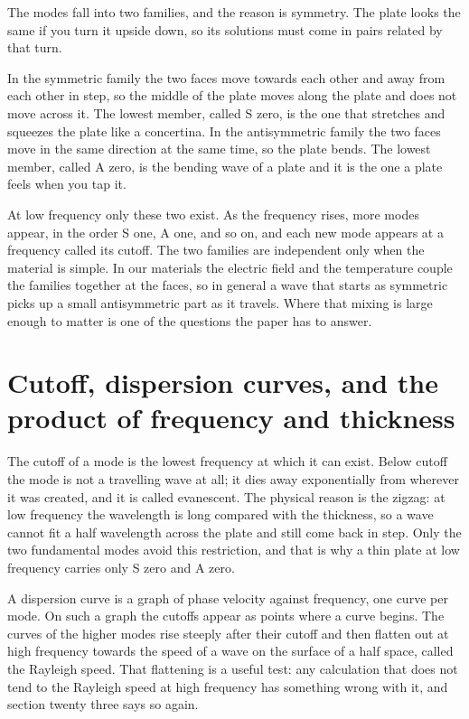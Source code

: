 \documentclass[11pt]{article}
\begin{document}
The modes fall into two families, and the reason is symmetry. The plate looks the same if you turn it upside
down, so its solutions must come in pairs related by that turn.

In the symmetric family the two faces move towards each other and away from each other in step, so the middle
of the plate moves along the plate and does not move across it. The lowest member, called S zero, is the one
that stretches and squeezes the plate like a concertina. In the antisymmetric family the two faces move in
the same direction at the same time, so the plate bends. The lowest member, called A zero, is the bending
wave of a plate and it is the one a plate feels when you tap it.

At low frequency only these two exist. As the frequency rises, more modes appear, in the order S one, A one,
and so on, and each new mode appears at a frequency called its cutoff. The two families are independent only
when the material is simple. In our materials the electric field and the temperature couple the families
together at the faces, so in general a wave that starts as symmetric picks up a small antisymmetric part as
it travels. Where that mixing is large enough to matter is one of the questions the paper has to answer.

\section{Cutoff, dispersion curves, and the product of frequency and thickness}

The cutoff of a mode is the lowest frequency at which it can exist. Below cutoff the mode is not a travelling
wave at all; it dies away exponentially from wherever it was created, and it is called evanescent. The
physical reason is the zigzag: at low frequency the wavelength is long compared with the thickness, so a wave
cannot fit a half wavelength across the plate and still come back in step. Only the two fundamental modes
avoid this restriction, and that is why a thin plate at low frequency carries only S zero and A zero.

A dispersion curve is a graph of phase velocity against frequency, one curve per mode. On such a graph the
cutoffs appear as points where a curve begins. The curves of the higher modes rise steeply after their cutoff
and then flatten out at high frequency towards the speed of a wave on the surface of a half space, called the
Rayleigh speed. That flattening is a useful test: any calculation that does not tend to the Rayleigh speed at
high frequency has something wrong with it, and section twenty three says so again.
\end{document}
